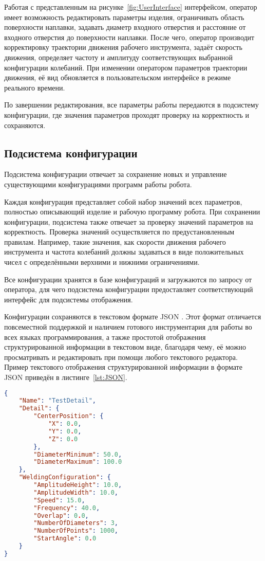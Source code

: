 Работая с представленным на рисунке~\ref{fig:UserInterface} интерфейсом, оператор имеет возможность редактировать параметры изделия, ограничивать область поверхности наплавки, задавать диаметр входного отверстия и расстояние от входного отверстия до поверхности наплавки.
После чего, оператор производит корректировку траектории движения рабочего инструмента, задаёт скорость движения, определяет частоту и амплитуду соответствующих выбранной конфигурации колебаний.
При изменении оператором параметров траектории движения, её вид обновляется в пользовательском интерфейсе в режиме реального времени.

По завершении редактирования, все параметры работы передаются в подсистему конфигурации, где значения параметров проходят проверку на корректность и сохраняются.

\subsection{Подсистема конфигурации}
Подсистема конфигурации отвечает за сохранение новых и управление существующими конфигурациями программ работы робота.

Каждая конфигурация представляет собой набор значений всех параметров, полностью описывающий изделие и рабочую программу робота.
При сохранении конфигурации, подсистема также отвечает за проверку значений параметров на корректность.
Проверка значений осуществляется по предустановленным правилам.
Например, такие значения, как скорости движения рабочего инструмента и частота колебаний должны задаваться в виде положительных чисел с определёнными верхними и нижними ограничениями.

Все конфигурации хранятся в базе конфигураций и загружаются по запросу от оператора, для чего подсистема конфигурации предоставляет соответствующий интерфейс для подсистемы отображения.

Конфигурации сохраняются в текстовом формате JSON .
Этот формат отличается повсеместной поддержкой и наличием готового инструментария для работы во всех языках программирования, а также простотой отображения структурированной информации в текстовом виде, благодаря чему, её можно просматривать и редактировать при помощи любого текстового редактора.
Пример текстового отображения структурированной информации в формате JSON приведён в листинге~\ref{lst:JSON}.

\begin{lstlisting}[language={json}, caption={Текстовое отображение информации в формате JSON}, label={lst:JSON}]
{
	"Name": "TestDetail",
	"Detail": {
		"CenterPosition": {
			"X": 0.0,
			"Y": 0.0,
			"Z": 0.0
		},
		"DiameterMinimum": 50.0,
		"DiameterMaximum": 100.0
	},
	"WeldingConfiguration": {
		"AmplitudeHeight": 10.0,
		"AmplitudeWidth": 10.0,
		"Speed": 15.0,
		"Frequency": 40.0,
		"Overlap": 0.0,
		"NumberOfDiameters": 3,
		"NumberOfPoints": 1000,
		"StartAngle": 0.0
	}
}
\end{lstlisting}

